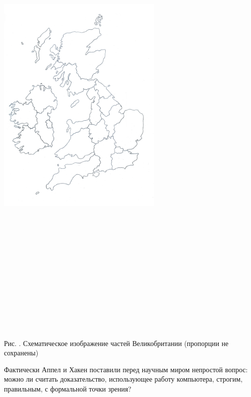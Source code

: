\begin{paracol}{2}
\includegraphics[width=8cm, height=24cm,keepaspectratio]{chapters/1/images/England}

\begin{center} \small Рис. \images. Схематическое изображение частей Великобритании (пропорции не сохранены) \end{center}
\end{paracol}

	Фактически Аппел и Хакен поставили перед научным миром непростой вопрос: можно ли считать доказательство, 
	использующее работу компьютера, строгим, правильным, с формальной точки зрения? 
	
